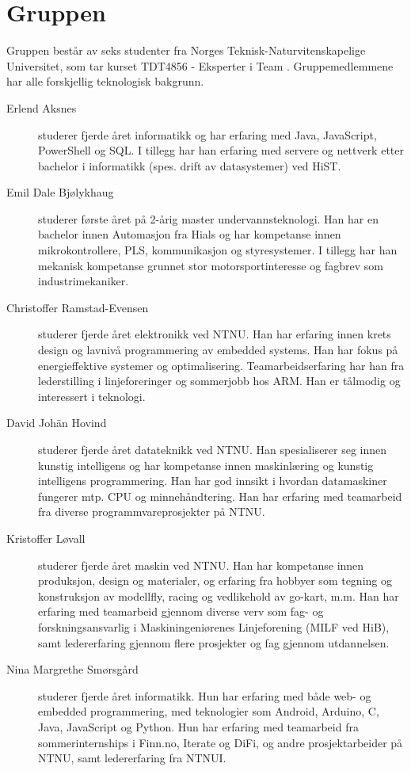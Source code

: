 \section{Gruppen}
Gruppen består av seks studenter fra Norges Teknisk-Naturvitenskapelige
Universitet, som tar kurset TDT4856 - Eksperter i Team \cite{tdt4856}. Gruppemedlemmene
har alle forskjellig teknologisk bakgrunn.
\begin{description} 

	\item[Erlend Aksnes] studerer fjerde året informatikk og har erfaring med Java, JavaScript, PowerShell og SQL. I tillegg har han erfaring med servere og nettverk etter bachelor i informatikk (spes. drift av datasystemer) ved HiST. 

	\item[Emil Dale Bjølykhaug] studerer første året på 2-årig master undervannsteknologi. 
Han har en bachelor innen Automasjon fra Hials og har kompetanse innen mikrokontrollere, PLS, 
kommunikasjon og styresystemer. I tillegg har han mekanisk kompetanse grunnet stor 
motorsportinteresse og fagbrev som industrimekaniker.

	\item[Christoffer Ramstad-Evensen] studerer fjerde
  året elektronikk ved NTNU. Han har erfaring innen krets design
  og lavnivå programmering av embedded systems. Han har fokus på energieffektive
  systemer og optimalisering. Teamarbeidserfaring har han fra lederstilling i
  linjeforeringer og sommerjobb hos ARM. Han er tålmodig og interessert i
  teknologi.
	\item[David Johän Hovind] studerer fjerde året datateknikk ved NTNU. 
	Han spesialiserer seg innen kunstig intelligens og har kompetanse innen maskinlæring
	og kunstig intelligens programmering. Han har god innsikt i hvordan datamaskiner fungerer
	mtp. CPU og minnehåndtering. Han har erfaring med teamarbeid fra diverse 
	programmvareprosjekter på NTNU.
	\item[Kristoffer Løvall] studerer fjerde året maskin ved NTNU. 
	Han har kompetanse innen produksjon, design og materialer, og erfaring
	fra hobbyer som tegning og konstruksjon av modellfly, racing og vedlikehold
	av go-kart, m.m. Han har erfaring med teamarbeid gjennom diverse verv som fag-
	og forskningsansvarlig i Maskiningeniørenes Linjeforening (MILF ved HiB), samt
	ledererfaring gjennom flere prosjekter og fag gjennom utdannelsen.
	
	\item[Nina Margrethe Smørsgård] studerer fjerde året
	informatikk. Hun har erfaring med både web- og embedded programmering, med
	teknologier som Android, Arduino, C, Java, JavaScript og Python. Hun har
	erfaring med teamarbeid fra sommerinternships i Finn.no, Iterate og DiFi,
	og andre prosjektarbeider på NTNU, samt ledererfaring fra NTNUI.
\end{description}